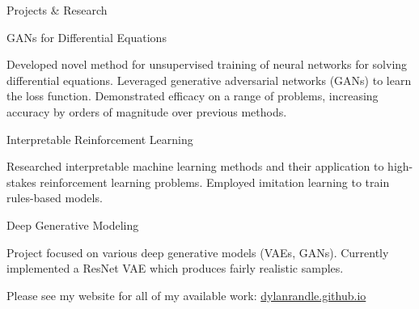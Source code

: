 \documentclass{resume} %
\begin{document}
\begin{rSection}{Projects \& Research}

\begin{rSubsection}{GANs for Differential Equations}{}{}{}

\item Developed novel method for unsupervised training of neural networks for solving differential equations. Leveraged generative adversarial networks (GANs) to learn the loss function. Demonstrated efficacy on a range of problems, increasing accuracy by orders of magnitude over previous methods.

\end{rSubsection}

\begin{rSubsection}{Interpretable Reinforcement Learning}{}{}{}

\item Researched interpretable machine learning methods and their application to high-stakes reinforcement learning problems. Employed imitation learning to train rules-based models. 

\end{rSubsection}

\begin{rSubsection}{Deep Generative Modeling}{}{}{}
\item Project focused on various deep generative models (VAEs, GANs). Currently implemented a ResNet VAE which produces fairly realistic samples.
\end{rSubsection}

Please see my website for all of my available work: \url{dylanrandle.github.io}

\end{rSection}




\end{document}
